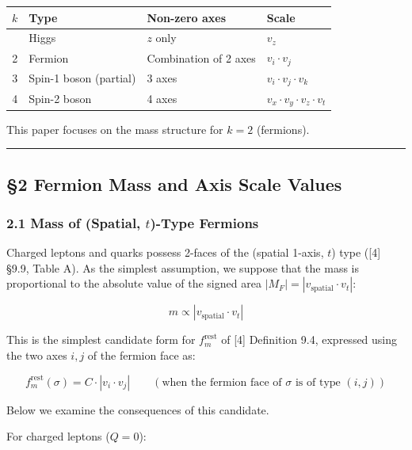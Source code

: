 \documentclass[
  a4paper,11pt]{article}
\newcounter{none}
\theoremstyle{definition}
\theoremstyle{remark}
\begin{document}
{\def\LTcaptype{none} %
\begin{longtable}[]{@{}clll@{}}
\toprule\noalign{}
\(k\) & Type & Non-zero axes & Scale \\
\midrule\noalign{}
\endhead
\bottomrule\noalign{}
\endlastfoot
1 & Higgs & \(z\) only & \(v_z\) \\
2 & Fermion & Combination of 2 axes & \(v_i \cdot v_j\) \\
3 & Spin-1 boson (partial) & 3 axes & \(v_i \cdot v_j \cdot v_k\) \\
4 & Spin-2 boson & 4 axes & \(v_x \cdot v_y \cdot v_z \cdot v_t\) \\
\end{longtable}
}

This paper focuses on the mass structure for \(k = 2\) (fermions).

\begin{center}\rule{0.5\linewidth}{0.5pt}\end{center}

\subsection{§2 Fermion Mass and Axis Scale
Values}\label{fermion-mass-and-axis-scale-values}

\subsubsection{\texorpdfstring{2.1 Mass of (Spatial, \(t\))-Type
Fermions}{2.1 Mass of (Spatial, t)-Type Fermions}}\label{mass-of-spatial-t-type-fermions}

Charged leptons and quarks possess 2-faces of the (spatial 1-axis,
\(t\)) type ({[}4{]} §9.9, Table A). As the simplest assumption, we
suppose that the mass is proportional to the absolute value of the
signed area \(|M_F| = |v_{\text{spatial}} \cdot v_t|\):

\[m \propto |v_{\text{spatial}} \cdot v_t|\]

This is the simplest candidate form for \(f_m^{\text{rest}}\) of {[}4{]}
Definition 9.4, expressed using the two axes \(i, j\) of the fermion
face as:

\[f_m^{\text{rest}}(\sigma) = C \cdot |v_i \cdot v_j| \qquad (\text{when the fermion face of } \sigma \text{ is of type } (i, j))\]

Below we examine the consequences of this candidate.

For charged leptons (\(Q = 0\)):
\end{document}
